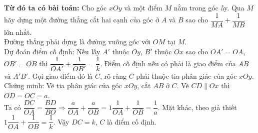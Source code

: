 \begin{bt}
{		\textbf{Từ đó ta có bài toán:} Cho góc $xOy$ và một điểm $M$ nằm trong góc ấy. Qua $M$ hãy dựng một đường thẳng cắt hai cạnh của góc ở $A$ và $B$ sao cho $\dfrac{1}{MA}+\dfrac{1}{MB}$ lớn nhất.\\
		Đường thẳng phải dựng là đường vuông góc với $OM$ tại $M$.\\
		Dự đoán điểm cố định: Nếu lấy $A'$ thuộc $Oy$, $B'$ thuộc $Ox$ sao cho $OA'=OA$, $OB'=OB$ thì $\dfrac{1}{OA'}+\dfrac{1}{OB'}=\dfrac{1}{k}$. Điểm cố định nếu có phải là giao điểm của $AB$ và $A'B'$. Gọi giao điểm đó là $C$, rõ ràng $C$ phải thuộc tia phân giác của góc $xOy$.\\
		Chứng minh: Vẽ tia phân giác của góc $xOy$, cắt $AB$ ở $C$. Vẽ $CD\parallel Ox$ thì $OD=OC=a$.\\ Ta có $\dfrac{DC}{OA}=\dfrac{BD}{BO}\Rightarrow \dfrac{a}{OA}+\dfrac{a}{OB}=1\dfrac{1}{OA}+\dfrac{1}{OB}=\dfrac{1}{a}$. Mặt khác, theo giả thiết  $1\dfrac{1}{OA}+\dfrac{1}{OB}=\dfrac{1}{k}$. Vậy $DC=k$, $C$ là điểm cố định.
	}
\end{bt}

